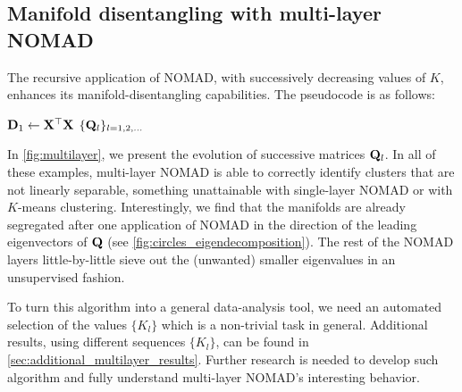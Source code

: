 \documentclass[twoside,11pt]{article}
\begin{document}
\subsection{Manifold disentangling with multi-layer NOMAD}

The recursive application of NOMAD, with successively decreasing values of $K$, enhances its manifold-disentangling capabilities. The pseudocode is as follows:

\newlength{\interspacetitleruledtemp}%
\newlength{\algotitleheightruletemp}%
\setlength{\interspacetitleruledtemp}{\interspacetitleruled}%
\setlength{\algotitleheightruletemp}{\algotitleheightrule}%
\setlength{\interspacetitleruled}{0pt}%
\setlength{\algotitleheightrule}{0pt}%
\begin{algorithm2e}[H]
	
    
	${\mathbf{D}}_1 \gets {{\mathbf{X}}}^\top {\mathbf{X}}$\;
	\Return $\{ {\mathbf{Q}}_{l} \}_{l=1,2,\dots}$
\end{algorithm2e}
\setlength{\interspacetitleruled}{\interspacetitleruledtemp}%
\setlength{\algotitleheightrule}{\algotitleheightruletemp}%

In \cref{fig:multilayer}, we present the evolution of successive matrices ${\mathbf{Q}}_{l}$. In all of these examples, multi-layer NOMAD is able to correctly identify clusters that are not linearly separable, something unattainable with single-layer NOMAD or with $K$-means clustering. Interestingly, we find that the manifolds are already segregated after one application of NOMAD in the direction of the leading eigenvectors of ${\mathbf{Q}}$ (see \cref{fig:circles_eigendecomposition}). The rest of the NOMAD layers little-by-little sieve out the (unwanted) smaller eigenvalues in an unsupervised fashion.

To turn this algorithm into a general data-analysis tool, we need an automated selection of the values $\{ K_l\}$ which is a non-trivial task in general. 
Additional results, using different sequences $\{ K_l\}$, can be found in \cref{sec:additional_multilayer_results}.
Further research is needed to develop such algorithm and fully understand multi-layer NOMAD's interesting behavior.
\end{document}
